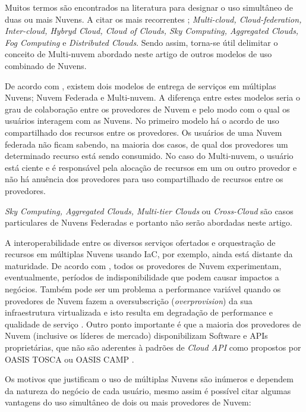 \documentclass[12pt]{article}
\begin{document}
	Muitos termos são encontrados na literatura para designar o uso simultâneo de duas ou mais Nuvens. A citar os mais recorrentes \cite{Ferrer:2012}; \textit{Multi-cloud, Cloud-federation, Inter-cloud, Hybryd Cloud, Cloud of Clouds, Sky Computing, Aggregated Clouds, Fog Computing} e \textit{Distributed Clouds}. Sendo assim, torna-se útil delimitar o conceito de Multi-nuvem abordado neste artigo de outros modelos de uso combinado de Nuvens.
	
	De acordo com \cite{Ferrer:2012}, existem dois modelos de entrega de serviços em múltiplas Nuvens; Nuvem Federada e Multi-nuvem. A diferença entre estes modelos seria o grau de colaboração entre os provedores de Nuvem e pelo modo com o qual os usuários interagem com as Nuvens. No primeiro modelo há o acordo de uso compartilhado dos recursos entre os provedores. Os usuários de uma Nuvem federada não ficam sabendo, na maioria dos casos, de qual dos provedores um determinado recurso está sendo consumido. No caso do Multi-nuvem, o usuário está ciente e é responsável pela alocação de recursos em um ou outro provedor e não há anuência dos provedores para uso compartilhado de recursos entre os provedores.
	
	\textit{Sky Computing, Aggregated Clouds, Multi-tier Clouds} ou \textit{Cross-Cloud} são casos particulares de Nuvens Federadas e portanto não serão abordadas neste artigo. 
	
	A interoperabilidade entre os diversos serviços ofertados e orquestração de recursos em múltiplas Nuvens usando IaC\cite{Morris:2016}, por exemplo, ainda está distante da maturidade. De acordo com \cite{Fisher:2018}, todos os provedores de Nuvem experimentam, eventualmente, períodos de indisponibilidade que podem causar impactos a negócios. Também pode ser um problema a performance variável quando os provedores de Nuvem fazem a oversubscrição (\textit{overprovision}) da sua infraestrutura virtualizada e isto resulta em degradação de performance e qualidade de serviço \cite{CloudSpectator:2017}. Outro ponto importante é que a maioria dos provedores de Nuvem (inclusive os líderes de mercado) disponibilizam Software e APIs proprietárias, que não são aderentes à padrões de \textit{Cloud API} como propostos por OASIS TOSCA \cite{TOSCA:2019} ou OASIS CAMP \cite{CAMP:2019}.
		
	Os motivos que justificam o uso de múltiplas Nuvens são inúmeros e dependem da natureza do negócio de cada usuário, mesmo assim é possível citar algumas vantagens do uso simultâneo de dois ou mais provedores de Nuvem:
	
\end{document}
